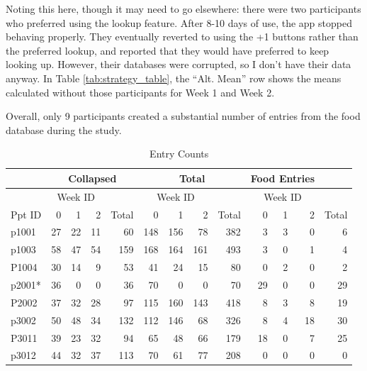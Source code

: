 Noting this here, though it may need to go elsewhere: there were two participants who preferred using the lookup feature. After 8-10 days of use, the app stopped behaving properly. They eventually reverted to using the +1 buttons rather than the preferred lookup, and reported that they would have preferred to keep looking up. However, their databases were corrupted, so I don't have their data anyway. In Table \ref{tab:strategy_table}, the ``Alt. Mean'' row shows the means calculated without those participants for Week 1 and Week 2. 

Overall, only 9 participants created a substantial number of entries from the food database during the study.  

\begin{table}[htbp]
\small
  \centering
  \caption{Entry Counts}
    \begin{tabular}{lrrrrrrrrrrrr}
    \toprule
          & \multicolumn{4}{c}{Collapsed} & \multicolumn{4}{c}{Total}     & \multicolumn{3}{c}{Food Entries} &  \\
    \midrule
          & \multicolumn{3}{c}{Week ID} & \multicolumn{1}{c}{} & \multicolumn{3}{c}{Week ID} & \multicolumn{1}{c}{} & \multicolumn{3}{c}{Week ID} &  \\
    Ppt ID & 0     & 1     & 2     & Total & 0     & 1     & 2     & Total & 0     & 1     & 2     & Total \\
    p1001 & 27    & 22    & 11    & 60    & 148   & 156   & 78    & 382   & 3     & 3     & 0     & 6 \\
    p1003 & 58    & 47    & 54    & 159   & 168   & 164   & 161   & 493   & 3     & 0     & 1     & 4 \\
    P1004 & 30    & 14    & 9     & 53    & 41    & 24    & 15    & 80    & 0     & 2     & 0     & 2 \\
    p2001* & 36    & 0     & 0     & 36    & 70    & 0     & 0     & 70    & 29    & 0     & 0     & 29 \\
    P2002 & 37    & 32    & 28    & 97    & 115   & 160   & 143   & 418   & 8     & 3     & 8     & 19 \\
    p3002 & 50    & 48    & 34    & 132   & 112   & 146   & 68    & 326   & 8     & 4     & 18    & 30 \\
    P3011 & 39    & 23    & 32    & 94    & 65    & 48    & 66    & 179   & 18    & 0     & 7     & 25 \\
    p3012 & 44    & 32    & 37    & 113   & 70    & 61    & 77    & 208   & 0     & 0     & 0     & 0 \\

\end{tabular}
\end{table}
